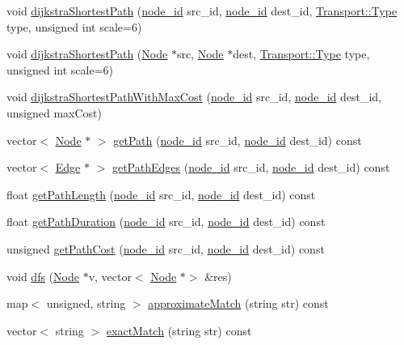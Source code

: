 \begin{DoxyCompactItemize}
\item 
void \hyperlink{class_graph_a0637f00ddc591f0cf9e785f84861b0cd}{dijkstra\+Shortest\+Path} (\hyperlink{_node_8hpp_a9d6265804805c2375068fd7484840dc6}{node\+\_\+id} src\+\_\+id, \hyperlink{_node_8hpp_a9d6265804805c2375068fd7484840dc6}{node\+\_\+id} dest\+\_\+id, \hyperlink{class_transport_a1879cecfed0d4238e5a7af6d085db317}{Transport\+::\+Type} type, unsigned int scale=6)
\item 
void \hyperlink{class_graph_a221f840da4ef4b6827d52c96f132b886}{dijkstra\+Shortest\+Path} (\hyperlink{class_node}{Node} $\ast$src, \hyperlink{class_node}{Node} $\ast$dest, \hyperlink{class_transport_a1879cecfed0d4238e5a7af6d085db317}{Transport\+::\+Type} type, unsigned int scale=6)
\item 
void \hyperlink{class_graph_a284736e6b467032dce3bfd69213c31f0}{dijkstra\+Shortest\+Path\+With\+Max\+Cost} (\hyperlink{_node_8hpp_a9d6265804805c2375068fd7484840dc6}{node\+\_\+id} src\+\_\+id, \hyperlink{_node_8hpp_a9d6265804805c2375068fd7484840dc6}{node\+\_\+id} dest\+\_\+id, unsigned max\+Cost)
\item 
vector$<$ \hyperlink{class_node}{Node} $\ast$ $>$ \hyperlink{class_graph_ae4c66eaf1b29f53bf90ad6266baa6819}{get\+Path} (\hyperlink{_node_8hpp_a9d6265804805c2375068fd7484840dc6}{node\+\_\+id} src\+\_\+id, \hyperlink{_node_8hpp_a9d6265804805c2375068fd7484840dc6}{node\+\_\+id} dest\+\_\+id) const
\item 
vector$<$ \hyperlink{class_edge}{Edge} $\ast$ $>$ \hyperlink{class_graph_a94db80dbb52cac57e2b5d14c53e649e7}{get\+Path\+Edges} (\hyperlink{_node_8hpp_a9d6265804805c2375068fd7484840dc6}{node\+\_\+id} src\+\_\+id, \hyperlink{_node_8hpp_a9d6265804805c2375068fd7484840dc6}{node\+\_\+id} dest\+\_\+id) const
\item 
float \hyperlink{class_graph_adb19e47c0238b012a6a3a28bdaf855f8}{get\+Path\+Length} (\hyperlink{_node_8hpp_a9d6265804805c2375068fd7484840dc6}{node\+\_\+id} src\+\_\+id, \hyperlink{_node_8hpp_a9d6265804805c2375068fd7484840dc6}{node\+\_\+id} dest\+\_\+id) const
\item 
float \hyperlink{class_graph_a2d69a99fb35fee10aadc243c468ad9b2}{get\+Path\+Duration} (\hyperlink{_node_8hpp_a9d6265804805c2375068fd7484840dc6}{node\+\_\+id} src\+\_\+id, \hyperlink{_node_8hpp_a9d6265804805c2375068fd7484840dc6}{node\+\_\+id} dest\+\_\+id) const
\item 
unsigned \hyperlink{class_graph_a9d5ab1a266d948f146e78866ef19673d}{get\+Path\+Cost} (\hyperlink{_node_8hpp_a9d6265804805c2375068fd7484840dc6}{node\+\_\+id} src\+\_\+id, \hyperlink{_node_8hpp_a9d6265804805c2375068fd7484840dc6}{node\+\_\+id} dest\+\_\+id) const
\item 
void \hyperlink{class_graph_ab596c4b805ecdf622c4f3d952f894a50}{dfs} (\hyperlink{class_node}{Node} $\ast$v, vector$<$ \hyperlink{class_node}{Node} $\ast$$>$ \&res)
\item 
map$<$ unsigned, string $>$ \hyperlink{class_graph_afc490a45976a80278106a4e49fe479b2}{approximate\+Match} (string str) const
\item 
vector$<$ string $>$ \hyperlink{class_graph_a41326c707607848d329e65dba0981747}{exact\+Match} (string str) const
\end{DoxyCompactItemize}


